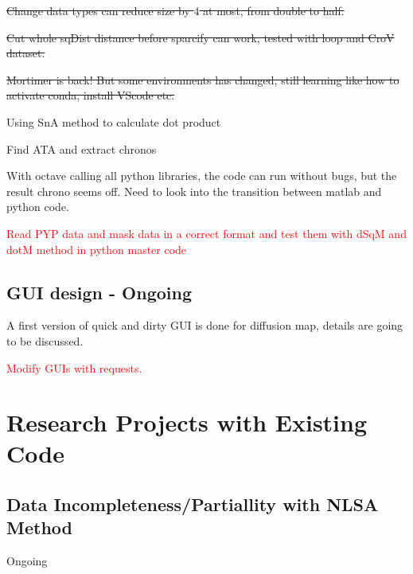 \documentclass{article}
\begin{document}
\st{Change data types can reduce size by $4$ at most, from double to half.}

\st{Cut whole sqDist distance before sparcify can work, tested with loop and CroV dataset.}

\st{Mortimer is back! But some environments has changed, still learning like how to activate conda, install VScode etc.}


\noindent Using SnA method to calculate dot product

\noindent Find ATA and extract chronos

\noindent With octave calling all python libraries, the code can run without bugs, but the result chrono seems off. Need to look into the transition between matlab and python code.

\noindent \textcolor{red}{Read PYP data and mask data in a correct format and test them with dSqM and dotM method in python master code}
\subsection*{GUI design - Ongoing}
A first version of quick and dirty GUI is done for diffusion map, details are going to be discussed.





\noindent \textcolor{red}{Modify GUIs with requests.}

\section*{Research Projects with Existing Code}
\subsection*{Data Incompleteness/Partiallity with NLSA Method}
Ongoing
\end{document}
